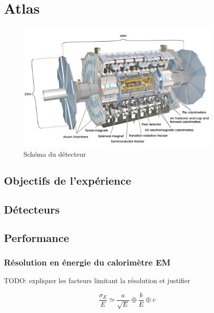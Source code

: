 \documentclass[11pt]{article} %
\begin{document}


\section{Atlas}

\begin{figure}[H]
\centering
  \caption{Schéma du détecteur}
 \includegraphics[width=0.9\textwidth]{../images/figures_AtlasDetectorLabelled.png}
\end{figure}

\subsection{Objectifs de l'expérience}

\subsection{Détecteurs}

\subsection{Performance}
\subsubsection{Résolution en énergie du calorimètre EM}

TODO: expliquer les facteurs limitant la résolution et justifier 

\begin{equation}
\dfrac{\sigma_E}{E} \simeq \dfrac{a}{\sqrt{E}} \oplus \dfrac{b}{E} \oplus c
\end{equation}
\end{document}
